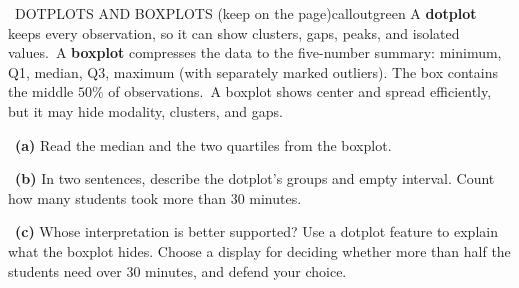 \documentclass[11pt]{article}
\begin{document}
\begin{callout}{\IconBook\ DOTPLOTS AND BOXPLOTS (keep on the page)}{calloutgreen}
A \textbf{dotplot} keeps every observation, so it can show clusters, gaps, peaks, and isolated values.\
A \textbf{boxplot} compresses the data to the five-number summary: minimum, Q1, median, Q3, maximum
(with separately marked outliers). The box contains the middle $50\%$ of observations.\
A boxplot shows center and spread efficiently, but it may hide modality, clusters, and gaps.
\end{callout}

~\textbf{(a)} Read the median and the two quartiles from the boxplot.\par
{}

~\textbf{(b)} In two sentences, describe the dotplot's groups and empty interval. Count how many students took more than 30 minutes.\par
{}

\dokbadge{3}~\textbf{(c)} Whose interpretation is better supported? Use a dotplot feature to explain what the boxplot hides. Choose a display for deciding whether more than half the students need over 30 minutes, and defend your choice.\par
{}
\end{document}
